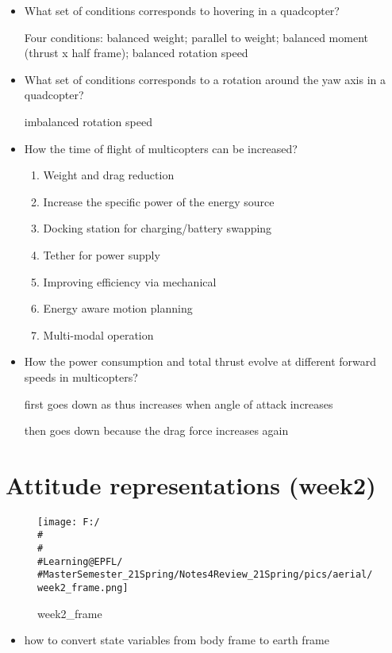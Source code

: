 \documentclass[]{article}
\begin{document}
\begin{itemize}
\item
  What set of conditions corresponds to hovering in a quadcopter?

  Four conditions: balanced weight; parallel to weight; balanced moment
  (thrust x half frame); balanced rotation speed
\item
  What set of conditions corresponds to a rotation around the yaw axis
  in a quadcopter?

  imbalanced rotation speed
\item
  How the time of flight of multicopters can be increased?

  \begin{enumerate}
  \def\labelenumi{\arabic{enumi}.}
  \item
    Weight and drag reduction
  \item
    Increase the specific power of the energy source
  \item
    Docking station for charging/battery swapping
  \item
    Tether for power supply
  \item
    Improving efficiency via mechanical
  \item
    Energy aware motion planning
  \item
    Multi-modal operation
  \end{enumerate}
\item
  How the power consumption and total thrust evolve at different forward
  speeds in multicopters?

  first goes down as thus increases when angle of attack increases

  then goes down because the drag force increases again
\end{itemize}

\section{Attitude representations (week2)}\label{header-n453}

\begin{figure}
\centering
\texttt{[image: F:/\\\#\\\#\\\#Learning@EPFL/\\\#MasterSemester\_21Spring/Notes4Review\_21Spring/pics/aerial/week2\_frame.png]}
\caption{week2\_frame}
\end{figure}

\begin{itemize}
\item
  how to convert state variables from body frame to earth frame
\end{itemize}
\end{document}
